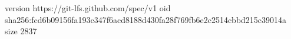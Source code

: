 version https://git-lfs.github.com/spec/v1
oid sha256:fcd6b09156fa193c347f6acd8188d430fa28f769fb6e2c2514cbbd215c39014a
size 2837

